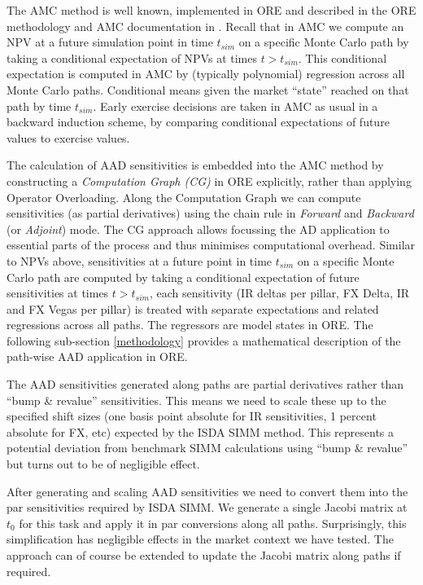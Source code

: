 \documentclass[11pt,a4paper,oneside]{article}
\begin{document}
The AMC method is well known, implemented in ORE and described in the ORE me\-tho\-do\-lo\-gy and AMC documentation in \cite{ORE-3}.
Recall that in AMC we compute an NPV at a future simulation point in time $t_{sim}$ on a specific Monte Carlo path by taking a conditional
expectation of NPVs at times $t>t_{sim}$. This conditional expectation is computed in AMC by (typically polynomial) regression
across all Monte Carlo paths.
Conditional means given the market ``state'' reached on that path by time $t_{sim}$. Early exercise decisions are taken in AMC
as usual in a backward induction scheme, by comparing conditional expectations of future values to exercise values. 

The calculation of AAD sensitivities is embedded into the AMC method by constructing a {\em Computation Graph (CG)} in ORE
explicitly, rather than applying Operator Overloading. Along the Computation Graph we can compute sensitivities
(as partial derivatives) using the chain rule in {\em Forward} and {\em Backward} (or {\em Adjoint}) mode.
The CG approach allows focussing the AD application to essential parts of the process
and thus minimises computational overhead. Similar to NPVs above, sensitivities at a future point in time
$t_{sim}$ on a specific Monte Carlo path are computed by taking a conditional expectation of future sensitivities at times
$t>t_{sim}$, each sensitivity (IR deltas per pillar, FX Delta, IR and FX Vegas per pillar) is treated with separate expectations
and related regressions across all paths. The regressors are model states in ORE.
The following sub-section \ref{methodology} provides a mathematical description of the path-wise AAD application in ORE.

The AAD sensitivities generated along paths are partial derivatives rather than ``bump \& revalue''
sensitivities. This means we need to scale these up to the specified shift sizes (one basis point absolute for
IR sensitivities, 1 percent absolute for FX, etc) expected by the ISDA SIMM method.
This represents a potential deviation from benchmark SIMM calculations using ``bump \& revalue'' but turns out to be of negligible effect.

After generating and scaling AAD sensitivities we need to convert them into the par sensitivities required by ISDA SIMM.
We generate a single Jacobi matrix at $t_0$ for this task and apply it in par conversions along all paths. Surprisingly, this
simplification has negligible effects in the market context we have tested. The approach can of course be extended
to update the Jacobi matrix along paths if required.
\end{document}
